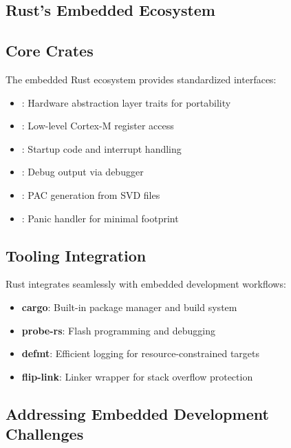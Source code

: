 \subsection{Rust's Embedded Ecosystem}
\label{sec:rust-embedded-ecosystem}

\subsection{Core Crates}

The embedded Rust ecosystem provides standardized interfaces:

\begin{itemize}
    \item {}: Hardware abstraction layer traits for portability
    \item {}: Low-level Cortex-M register access
    \item {}: Startup code and interrupt handling
    \item {}: Debug output via debugger
    \item {}: PAC generation from SVD files
    \item {}: Panic handler for minimal footprint
\end{itemize}

\subsection{Tooling Integration}

Rust integrates seamlessly with embedded development workflows:

\begin{itemize}
    \item \textbf{cargo}: Built-in package manager and build system
    \item \textbf{probe-rs}: Flash programming and debugging
    \item \textbf{defmt}: Efficient logging for resource-constrained targets
    \item \textbf{flip-link}: Linker wrapper for stack overflow protection
\end{itemize}

\subsection{Addressing Embedded Development Challenges}
\label{sec:embedded-challenges}

